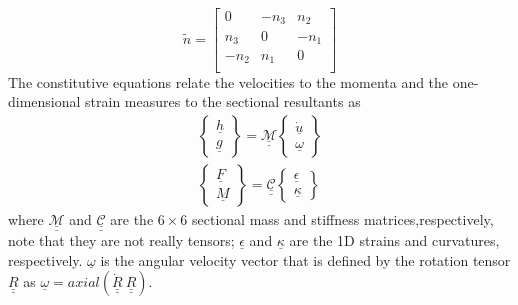 \documentclass{aiaa-tc}
\renewcommand{\skew}[1]{\widetilde{#1}}
\begin{document}
\[
	\skew{n} = 
	     		\begin{bmatrix}
			0 & -n_3 & n_2 \\
			n_3 & 0 & -n_1 \\
			-n_2 & n_1 & 0\\
			\end{bmatrix}	
\]
The constitutive equations relate the velocities to the momenta and the one-dimensional strain measures to the sectional resultants as
\begin{align}
	\label{ConstitutiveMass}
	\begin{Bmatrix}
	\underline{h} \\
	\underline{g}
	\end{Bmatrix}
	= \underline{\underline{\mathcal{M}}} \begin{Bmatrix}
	\dot{\underline{u}} \\
	\underline{\omega}
	\end{Bmatrix} \\
	\label{ConstitutiveStiff}
	\begin{Bmatrix}
	\underline{F} \\
	\underline{M}
	\end{Bmatrix}
	= \underline{\underline{\mathcal{C}}} \begin{Bmatrix}
	\underline{\epsilon} \\
	\underline{\kappa}
	\end{Bmatrix}
\end{align}
where $\underline{\underline{\mathcal{M}}}$ and $\underline{\underline{\mathcal{C}}}$ are the $6 \times 6$ sectional mass and stiffness matrices,respectively, note that they are not really tensors; $\underline{\epsilon}$ and $\underline{\kappa}$ are the 1D strains and curvatures, respectively. $\underline{\omega}$ is the angular velocity vector that is defined by the rotation tensor $\underline{\underline{R}}$ as $\underline{\omega} = axial(\dot{\underline{\underline{R}}}~\underline{\underline{R}})$.
\end{document}
